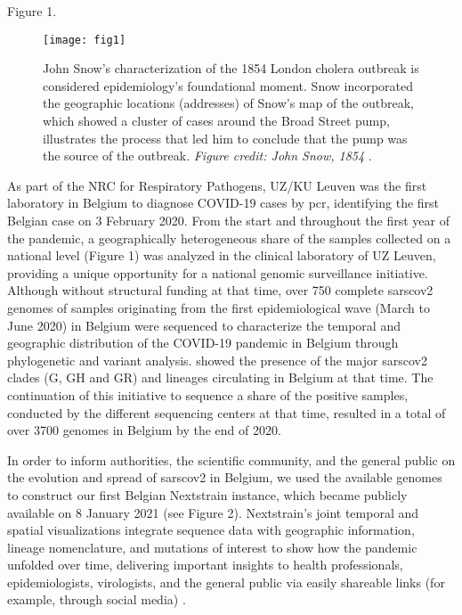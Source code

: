 Figure 1. 
\begin{figure}[ht]
  \centering
  \texttt{[image: fig1]}
  \caption[John Snow's map of the 1854 Broad Street cholera outbreak in London]{John Snow's characterization of the 1854 London cholera outbreak is considered epidemiology's foundational moment. Snow incorporated the geographic locations (addresses) of Snow's map of the outbreak, which showed a cluster of cases around the Broad Street pump, illustrates the process that led him to conclude that the pump was the source of the outbreak. \textit{Figure credit: John Snow, 1854} \citep{snow1854mode}.}
  \label{fig:broadStreetPump}
\end{figure}

As part of the NRC for Respiratory Pathogens, UZ/KU Leuven was the first laboratory in Belgium to diagnose COVID-19 cases by \gls{pcr}, identifying the first Belgian case on 3 February 2020.
From the start and throughout the first year of the pandemic, a geographically heterogeneous share of the samples collected on a national level (Figure 1) was analyzed in the clinical laboratory of UZ Leuven, providing a unique opportunity for a national genomic surveillance initiative.
Although without structural funding at that time, over 750 complete \gls{sarscov2} genomes of samples originating from the first epidemiological wave (March to June 2020) in Belgium were sequenced to characterize the temporal and geographic distribution of the COVID-19 pandemic in Belgium through phylogenetic and variant analysis.
\citet{wawina-bokalanga2021genetic} showed the presence of the major \gls{sarscov2} clades (G, GH and GR) and lineages circulating in Belgium at that time.
The continuation of this initiative to sequence a share of the positive samples, conducted by the different sequencing centers at that time, resulted in a total of over 3700 genomes in Belgium by the end of 2020.

In order to inform authorities, the scientific community, and the general public on the evolution and spread of \gls{sarscov2} in Belgium, we used the available genomes to construct our first Belgian Nextstrain instance, which became publicly available on 8 January 2021 (see Figure 2).
Nextstrain's joint temporal and spatial visualizations integrate sequence data with geographic information, lineage nomenclature, and mutations of interest to show how the pandemic unfolded over time, delivering important insights to health professionals, epidemiologists, virologists, and the general public via easily shareable links (for example, through social media) \citep{hadfield2018nextstrain}.


